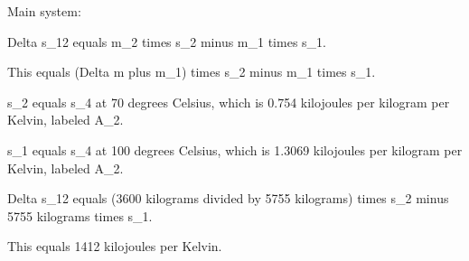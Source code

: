 Main system:

Delta s_12 equals m_2 times s_2 minus m_1 times s_1.

This equals (Delta m plus m_1) times s_2 minus m_1 times s_1.

s_2 equals s_4 at 70 degrees Celsius, which is 0.754 kilojoules per kilogram per Kelvin, labeled A_2.

s_1 equals s_4 at 100 degrees Celsius, which is 1.3069 kilojoules per kilogram per Kelvin, labeled A_2.

Delta s_12 equals (3600 kilograms divided by 5755 kilograms) times s_2 minus 5755 kilograms times s_1.

This equals 1412 kilojoules per Kelvin.